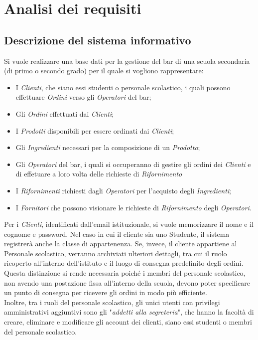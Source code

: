 \documentclass[12pt,a4paper]{article}
\begin{document}
    \section{Analisi dei requisiti}
    \subsection{Descrizione del sistema informativo}
    \label{par:Descrizione del sistema informativo}
    Si vuole realizzare una base dati per la gestione del bar di una scuola secondaria (di primo o secondo grado) per il quale si vogliono rappresentare:
    \begin{itemize}[leftmargin=1em]
        \item I \textit{Clienti}, che siano essi studenti o personale scolastico, i quali possono effettuare \textit{Ordini} verso gli \textit{Operatori} del bar;
        \item Gli \textit{Ordini} effettuati dai \textit{Clienti};
        \item I \textit{Prodotti} disponibili per essere ordinati dai \textit{Clienti};
        \item Gli \textit{Ingredienti} necessari per la composizione di un \textit{Prodotto};
        \item Gli \textit{Operatori} del bar, i quali si occuperanno di gestire gli ordini dei \textit{Clienti} e di effetuare a loro volta delle richieste di \textit{Rifornimento}
        \item I \textit{Rifornimenti} richiesti dagli \textit{Operatori} per l'acquisto degli \textit{Ingredienti};
        \item I \textit{Fornitori} che possono visionare le richieste di \textit{Rifornimento} degli \textit{Operatori}.
    \end{itemize}

    \vspace{8pt}
    \noindent
    Per i \textit{Clienti}, identificati dall'email istituzionale, si vuole memorizzare il nome e il cognome e password. Nel caso in cui il cliente sia uno Studente, il sistema registrerà anche la classe di appartenenza. Se, invece, il cliente appartiene al Personale scolastico, verranno archiviati ulteriori dettagli, tra cui il ruolo ricoperto all'interno dell'istituto e il luogo di consegna predefinito degli ordini. Questa distinzione si rende necessaria poiché i membri del personale scolastico, non avendo una postazione fissa all'interno della scuola, devono poter specificare un punto di consegna per ricevere gli ordini in modo più efficiente.\\
    Inoltre, tra i ruoli del personale scolastico, gli unici utenti con privilegi amministrativi aggiuntivi sono gli "\textit{addetti alla segreteria}", che hanno la facoltà di creare, eliminare e modificare gli account dei clienti, siano essi studenti o membri del personale scolastico.
\end{document}
